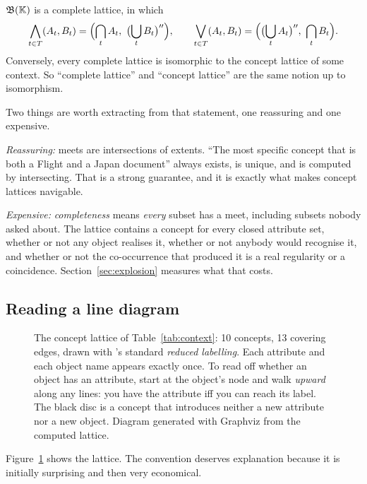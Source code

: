 \begin{theorem}
\label{thm:basic}
$\mathfrak{B}(\mathbb{K})$ is a complete lattice, in which
\[
  \bigwedge_{t \in T}(A_t, B_t) =
    \Bigl(\bigcap_{t} A_t,\ \bigl(\bigcup_{t} B_t\bigr)''\Bigr),
  \qquad
  \bigvee_{t \in T}(A_t, B_t) =
    \Bigl(\bigl(\bigcup_{t} A_t\bigr)'',\ \bigcap_{t} B_t\Bigr).
\]
Conversely, every complete lattice is isomorphic to the concept lattice of
some context. So ``complete lattice'' and ``concept lattice'' are the same
notion up to isomorphism.
\end{theorem}

Two things are worth extracting from that statement, one reassuring and one
expensive.

\emph{Reassuring:} meets are intersections of extents. ``The most specific
concept that is both a \textsf{Flight} and a \textsf{Japan} document'' always
exists, is unique, and is computed by intersecting. That is a strong
guarantee, and it is exactly what makes concept lattices navigable.

\emph{Expensive:} \emph{completeness} means \emph{every} subset has a meet,
including subsets nobody asked about. The lattice contains a concept for every
closed attribute set, whether or not any object realises it, whether or not
anybody would recognise it, and whether or not the co-occurrence that produced
it is a real regularity or a coincidence. Section~\ref{sec:explosion} measures
what that costs.

\subsection{Reading a line diagram}

\begin{figure}[t]
\centering
{}
\caption{The concept lattice of Table~\ref{tab:context}: 10 concepts, 13
covering edges, drawn with \fca{}'s standard \emph{reduced labelling}. Each
attribute and each object name appears exactly once. To read off whether an
object has an attribute, start at the object's node and walk \emph{upward}
along any lines: you have the attribute iff you can reach its label. The black
disc is a concept that introduces neither a new attribute nor a new object.
Diagram generated with Graphviz from the computed lattice.}
\label{fig:lattice}
\end{figure}

Figure~\ref{fig:lattice} shows the lattice. The convention deserves
explanation because it is initially surprising and then very economical.

